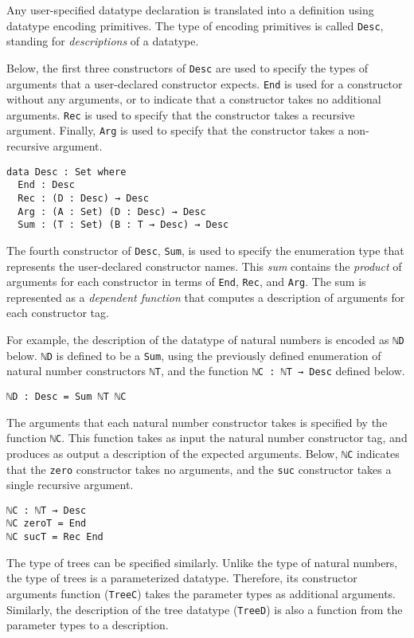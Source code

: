 \documentclass[runningheads,a4paper]{llncs}
\begin{document}
Any user-specified datatype declaration is translated into a
definition using datatype encoding primitives. The type of encoding
primitives is called {\tt Desc}, standing for {\it descriptions} of a
datatype.

Below, the first three constructors of {\tt Desc} are used to specify
the types of arguments that a user-declared constructor expects.
{\tt End} is used for a constructor without any arguments, or to
indicate that a constructor takes no additional arguments.
{\tt Rec} is used to specify that the
constructor takes a recursive argument. Finally,
{\tt Arg} is used to specify that the constructor takes a
non-recursive argument.

\begin{verbatim}
data Desc : Set where
  End : Desc
  Rec : (D : Desc) → Desc
  Arg : (A : Set) (D : Desc) → Desc
  Sum : (T : Set) (B : T → Desc) → Desc
\end{verbatim}

The fourth constructor of {\tt Desc}, {\tt Sum}, is used to specify
the enumeration type that represents the user-declared constructor
names. This {\it sum} contains the {\it product} of arguments for
each constructor in terms of {\tt End}, {\tt Rec}, and {\tt Arg}. The
sum is represented as a {\it dependent function} that computes a
description of arguments for each constructor tag.

For example, the description of the datatype of natural numbers is
encoded as {\tt ℕD} below. {\tt ℕD} is defined to be a {\tt Sum},
using the previously defined enumeration of natural number
constructors {\tt ℕT}, and the function {\tt ℕC : ℕT → Desc} defined
below.

\begin{verbatim}
ℕD : Desc = Sum ℕT ℕC
\end{verbatim}

The arguments that each natural number constructor takes is specified
by the function {\tt ℕC}. This function takes as input the natural
number constructor tag, and
produces as output a description of the expected arguments. Below,
{\tt ℕC} indicates that the {\tt zero} constructor takes no arguments,
and the {\tt suc} constructor takes a single recursive argument.

\begin{verbatim}
ℕC : ℕT → Desc
ℕC zeroT = End
ℕC sucT = Rec End
\end{verbatim}

The type of trees can be specified similarly. Unlike the type of
natural numbers, the type of trees is a parameterized datatype.
Therefore, its constructor arguments function ({\tt TreeC}) takes the
parameter types as additional arguments. Similarly, the description
of the tree datatype ({\tt TreeD}) is also a function from the parameter
types to a description.
\end{document}
